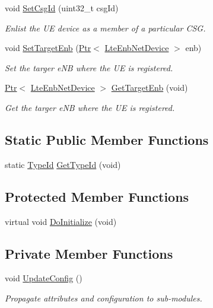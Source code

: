 \begin{DoxyCompactItemize}
void \hyperlink{classns3_1_1LteUeNetDevice_a96e1a8cb85a7bd42dfce4f439a4295b2}{Set\+Csg\+Id} (uint32\+\_\+t csg\+Id)
\begin{DoxyCompactList}\small\item\em Enlist the UE device as a member of a particular C\+SG. \end{DoxyCompactList}\item 
void \hyperlink{classns3_1_1LteUeNetDevice_ad16b1017f9e01382753de3f95a34f6c6}{Set\+Target\+Enb} (\hyperlink{classns3_1_1Ptr}{Ptr}$<$ \hyperlink{classns3_1_1LteEnbNetDevice}{Lte\+Enb\+Net\+Device} $>$ enb)
\begin{DoxyCompactList}\small\item\em Set the targer e\+NB where the UE is registered. \end{DoxyCompactList}\item 
\hyperlink{classns3_1_1Ptr}{Ptr}$<$ \hyperlink{classns3_1_1LteEnbNetDevice}{Lte\+Enb\+Net\+Device} $>$ \hyperlink{classns3_1_1LteUeNetDevice_a9506233a2a840bcc5799d9e865ce189b}{Get\+Target\+Enb} (void)
\begin{DoxyCompactList}\small\item\em Get the targer e\+NB where the UE is registered. \end{DoxyCompactList}\end{DoxyCompactItemize}
\subsection*{Static Public Member Functions}
\begin{DoxyCompactItemize}
\item 
static \hyperlink{classns3_1_1TypeId}{Type\+Id} \hyperlink{classns3_1_1LteUeNetDevice_a700863f457ad4c1133324e8c7a025f66}{Get\+Type\+Id} (void)
\end{DoxyCompactItemize}
\subsection*{Protected Member Functions}
\begin{DoxyCompactItemize}
\item 
virtual void \hyperlink{classns3_1_1LteUeNetDevice_a6c883da6fa862a13427d3e25053d23cf}{Do\+Initialize} (void)
\end{DoxyCompactItemize}
\subsection*{Private Member Functions}
\begin{DoxyCompactItemize}
\item 
void \hyperlink{classns3_1_1LteUeNetDevice_a4b52e9dbdfbd9deba82c2700d814e114}{Update\+Config} ()
\begin{DoxyCompactList}\small\item\em Propagate attributes and configuration to sub-\/modules. \end{DoxyCompactList}\end{DoxyCompactItemize}
